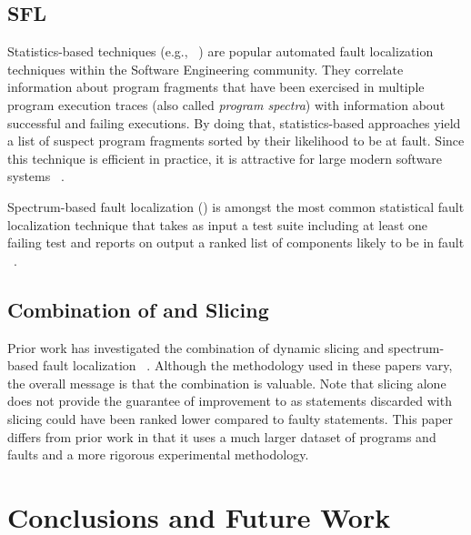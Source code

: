 \documentclass{article}
\begin{document}
\subsection{SFL}

Statistics-based techniques (e.g., ~\cite{Pearson:2017:EIF:3097368.3097441}) are
popular automated fault localization techniques within the Software Engineering
community. They correlate information about program fragments that have been
exercised in multiple program execution traces (also called \textit{program
spectra}) with information about successful and failing executions. By doing
that, statistics-based approaches yield a list of suspect program fragments
sorted by their likelihood to be at fault. Since this technique is efficient in
practice, it is attractive for large modern software systems ~\cite{Zoeteweij:2007:DES:1251988.1253298}.

Spectrum-based fault localization (\sfl{}) is amongst the most common statistical
fault localization technique that takes as input a test suite including at least
one failing test and reports on output a ranked list of components likely to be
in fault ~\cite{FLSurvey2016,DBLP:conf/kbse/JonesH05,DBLP:journals/smr/LuciaLJTB14,DBLP:journals/jss/AbreuZGG09}.

\subsection{Combination of \sfl{} and Slicing}

Prior work has investigated the combination of dynamic slicing and
spectrum-based fault
localization ~\cite{Wotawa:2010:FLB:1848650.1849235,Alves:2011:FUD:2190078.2190115,DBLP:conf/ecai/HoferW12,lei-mao-dai-wang-2012,slicing-sfl-repair}. Although
the methodology used in these papers vary, the overall message is that
the combination is valuable. Note that slicing alone does not provide
the guarantee of improvement to \sfl{} as statements discarded with
slicing could have been ranked lower compared to faulty
statements. This paper differs from prior work in that it uses a much
larger dataset of programs and faults and a more rigorous experimental
methodology.
%
\section{Conclusions and Future Work}
\label{sec:conc}
%
\end{document}
